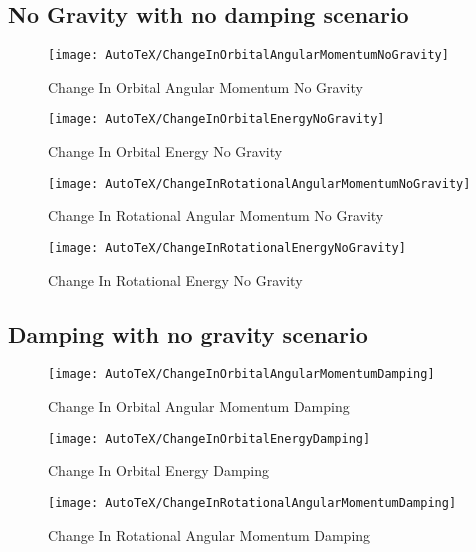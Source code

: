 \subsection{No Gravity with no damping scenario}
\begin{figure}[htbp]
	\centerline{
		\texttt{[image: AutoTeX/ChangeInOrbitalAngularMomentumNoGravity]}}
	\caption{Change In Orbital Angular Momentum No Gravity}
	\label{fig:ChangeInOrbitalAngularMomentumNoGravity}
\end{figure}
\begin{figure}[htbp]
	\centerline{
		\texttt{[image: AutoTeX/ChangeInOrbitalEnergyNoGravity]}}
	\caption{Change In Orbital Energy No Gravity}
	\label{fig:ChangeInOrbitalEnergyNoGravity}
\end{figure}
\begin{figure}[htbp]
	\centerline{
		\texttt{[image: AutoTeX/ChangeInRotationalAngularMomentumNoGravity]}}
	\caption{Change In Rotational Angular Momentum No Gravity}
	\label{fig:ChangeInRotationalAngularMomentumNoGravity}
\end{figure}
\begin{figure}[htbp]
	\centerline{
		\texttt{[image: AutoTeX/ChangeInRotationalEnergyNoGravity]}}
	\caption{Change In Rotational Energy No Gravity}
	\label{fig:ChangeInRotationalEnergyNoGravity}
\end{figure}

\clearpage

\subsection{Damping with no gravity scenario}
\begin{figure}[htbp]
	\centerline{
		\texttt{[image: AutoTeX/ChangeInOrbitalAngularMomentumDamping]}}
	\caption{Change In Orbital Angular Momentum Damping}
	\label{fig:ChangeInOrbitalAngularMomentumNoGravityDamping}
\end{figure}
\begin{figure}[htbp]
	\centerline{
		\texttt{[image: AutoTeX/ChangeInOrbitalEnergyDamping]}}
	\caption{Change In Orbital Energy Damping}
	\label{fig:ChangeInOrbitalEnergyDamping}
\end{figure}
\begin{figure}[htbp]
	\centerline{
		\texttt{[image: AutoTeX/ChangeInRotationalAngularMomentumDamping]}}
	\caption{Change In Rotational Angular Momentum Damping}
	\label{fig:ChangeInRotationalAngularMomentumDamping}
\end{figure}
\clearpage
